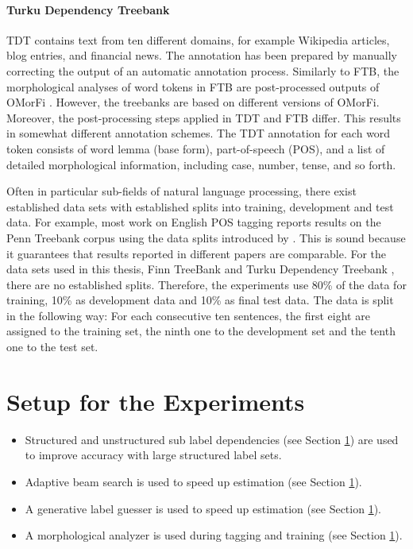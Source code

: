 \paragraph{Turku Dependency Treebank} TDT \citep{Haverinen2013} contains text from ten different domains, for example Wikipedia articles, blog entries, and financial news. The annotation has been prepared by manually correcting the output of an automatic annotation process.
Similarly to FTB, the morphological analyses of word tokens in FTB are
post-processed outputs of OMorFi \citep{Pirinen2011}. However, the
treebanks are based on different versions of OMorFi. Moreover, the
post-processing steps applied in TDT and FTB differ. This results in
somewhat different annotation schemes.  The TDT annotation for each
word token consists of word lemma (base form), part-of-speech (POS),
and a list of detailed morphological information, including case,
number, tense, and so forth.

Often in particular sub-fields of natural language processing, there
exist established data sets with established splits into training,
development and test data. For example, most work on English POS
tagging reports results on the Penn Treebank corpus \citep{Marcus1993}
using the data splits introduced by \cite{Collins2002}. This is sound
because it guarantees that results reported in different papers are
comparable. For the data sets used in this thesis, Finn TreeBank
\citep{Voutilainen2011} and Turku Dependency Treebank
\citep{Haverinen2013}, there are no established splits. Therefore, the
experiments use 80\% of the data for training, 10\% as development
data and 10\% as final test data. The data is split in the following
way: For each consecutive ten sentences, the first eight are assigned
to the training set, the ninth one to the development set and the
tenth one to the test set.

\section{Setup for the Experiments}

\begin{itemize}
\item Structured and unstructured sub label dependencies (see Section \ref{}) are used to improve accuracy with large structured label sets.
\item Adaptive beam search is used to speed up estimation (see Section \ref{}).
\item A generative label guesser is used to speed up estimation (see Section \ref{}).
\item A morphological analyzer is used during tagging and training (see Section \ref{}).
\end{itemize}

